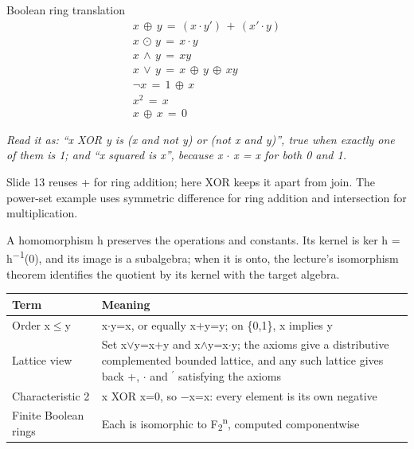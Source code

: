 \documentclass[11pt]{article}
\begin{document}
\begin{keepsection}
\begin{keepsection}
\begin{equationcard}{Boolean ring translation}
\[ \begin{gathered} {x}\, ⊕\, {y}\, =\, ({x}\cdot {y}')\, +\, ({x}'\cdot {y}) \\ {x}\, ⊙\, {y}\, =\, {x}\cdot {y} \\ {x}\, \land \, {y}\, =\, {x}{y} \\ {x}\, \lor \, {y}\, =\, {x}\, ⊕\, {y}\, ⊕\, {x}{y} \\ \neg {x}\, =\, 1\, ⊕\, {x} \\ {x}^{2}\, =\, {x} \\ {x}\, ⊕\, {x}\, =\, 0 \end{gathered} \]
{\small \emph{Read it as: “x XOR y is (x and not y) or (not x and y)”, true when exactly one of them is 1; and “x squared is x”, because x \ensuremath{\cdot} x = x for both 0 and 1.}\par Slide 13 reuses + for ring addition; here XOR keeps it apart from join. The power-set example uses symmetric difference for ring addition and intersection for multiplication.}
\end{equationcard}

A homomorphism h preserves the operations and constants. Its kernel is ker h = h\textsuperscript{\ensuremath{-}1}(0), and its image is a subalgebra; when it is onto, the lecture’s isomorphism theorem identifies the quotient by its kernel with the target algebra.

\begin{center}\small\begin{tabularx}{\linewidth}{>{\raggedright\arraybackslash}X>{\raggedright\arraybackslash}X}\toprule
\textbf{Term} & \textbf{Meaning} \\ \midrule
Order x\ensuremath{\leq}y & x\ensuremath{\cdot}y=x, or equally x+y=y; on \{0,1\}, x implies y \\
Lattice view & Set x\ensuremath{\lor}y=x+y and x\ensuremath{\land}y=x\ensuremath{\cdot}y; the axioms give a distributive complemented bounded lattice, and any such lattice gives back +, \ensuremath{\cdot} and \ensuremath{{}^{\prime}} satisfying the axioms \\
Characteristic 2 & x XOR x=0, so \ensuremath{-}x=x: every element is its own negative \\
Finite Boolean rings & Each is isomorphic to F\textsubscript{2}\textsuperscript{n}, computed componentwise \\
\bottomrule\end{tabularx}\end{center}


\end{keepsection}
\end{keepsection}
\end{document}
